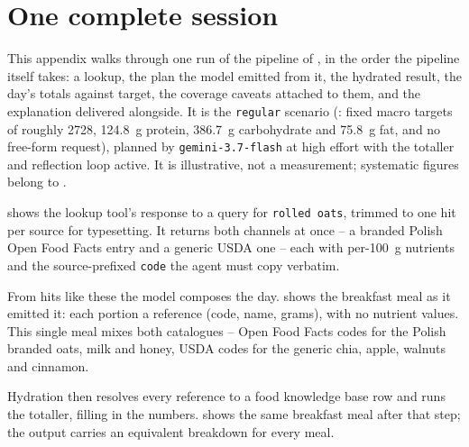 \chapter{One complete session}
\label{cha:worked-example}

This appendix walks through one run of the pipeline of , in the order the pipeline itself takes: a lookup, the plan the model emitted from it, the hydrated result, the day's totals against target, the coverage caveats attached to them, and the explanation delivered alongside. It is the \texttt{regular} scenario (: fixed macro targets of roughly \qty{2728}{\kcal}, \qty{124.8}{\gram} protein, \qty{386.7}{\gram} carbohydrate and \qty{75.8}{\gram} fat, and no free-form request), planned by \texttt{gemini-3.7-flash} at high effort with the totaller and reflection loop active. It is illustrative, not a measurement; systematic figures belong to .

 shows the lookup tool's response to a query for \texttt{rolled oats}, trimmed to one hit per source for typesetting. It returns both channels at once -- a branded Polish Open Food Facts entry and a generic USDA one -- each with per-\qty{100}{\gram} nutrients and the source-prefixed \texttt{code} the agent must copy verbatim.



From hits like these the model composes the day.  shows the breakfast meal as it emitted it: each portion a reference (code, name, grams), with no nutrient values. This single meal mixes both catalogues -- Open Food Facts codes for the Polish branded oats, milk and honey, USDA codes for the generic chia, apple, walnuts and cinnamon.



Hydration then resolves every reference to a food knowledge base row and runs the totaller, filling in the numbers.  shows the same breakfast meal after that step; the output carries an equivalent breakdown for every meal.

\begin{table}[htbp]
    \centering
    \footnotesize
    \setlength{\tabcolsep}{3pt}
    
    \caption[Hydrated breakfast totals.]{The breakfast meal after hydration. Each row is rounded independently, so a meal total need not equal the sum of the displayed portion figures.}
    \label{tab:example-breakfast-items}
\end{table}

